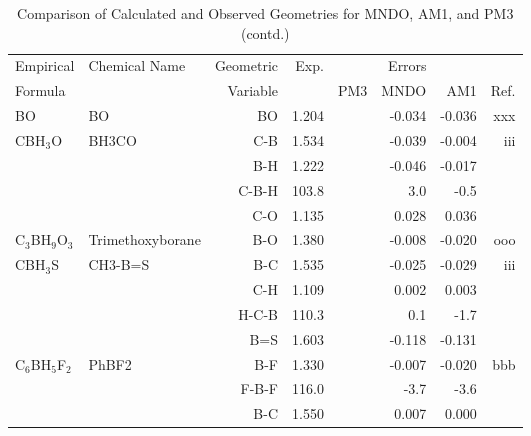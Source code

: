 \begin{table}
\caption{\label{geotabn}Comparison of Calculated and Observed Geometries for 
MNDO, AM1, and PM3 (contd.)}
\begin{center}
\compresstable
\begin{tabular}{llrrrrrr}
 Empirical  & Chemical Name &  Geometric &  Exp. & \multicolumn{3}{c}{Errors} & \\
  Formula   &               &  Variable &        & PM3  & MNDO  &  AM1 & Ref.\\
\hline
 BO          & BO                                 &BO            &     1.204   &  &    -0.034 &    -0.036 &   xxx \\
 CBH$_3$O       & BH3CO                              &C-B           &     1.534   &  &    -0.039 &    -0.004 &   iii \\
             &                                    &B-H           &     1.222   &  &    -0.046 &    -0.017 &       \\
             &                                    &C-B-H       &     103.8   &  &       3.0 &      -0.5   &       \\
             &                                    &C-O           &     1.135   &  &     0.028 &     0.036 &       \\
 C$_3$BH$_9$O$_3$     & Trimethoxyborane                   &B-O           &     1.380   &  &    -0.008 &    -0.020 &   ooo \\
 CBH$_3$S       & CH3-B=S                            &B-C           &     1.535   &  &    -0.025 &    -0.029 &   iii \\
             &                                    &C-H           &     1.109   &  &     0.002 &     0.003 &       \\
             &                                    &H-C-B       &     110.3   &  &       0.1 &      -1.7   &       \\
             &                                    &B=S           &     1.603   &  &    -0.118 &    -0.131 &       \\
 C$_6$BH$_5$F$_2$     & PhBF2                              &B-F           &     1.330   &  &    -0.007 &    -0.020 &   bbb \\
             &                                    &F-B-F       &     116.0   &  &      -3.7 &      -3.6   &       \\
             &                                    &B-C           &     1.550   &  &     0.007 &     0.000 &       \\

\end{tabular}
\end{center}
\end{table}
